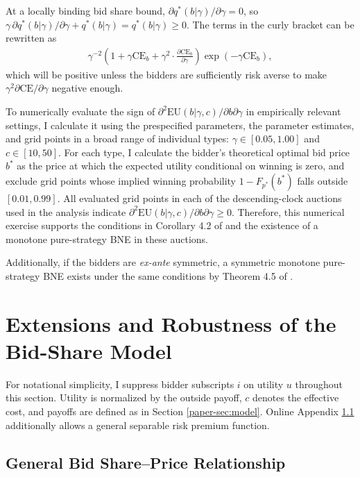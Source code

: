 \documentclass[12pt]{article}
\theoremstyle{definition} %
\begin{document}
At a locally binding bid share bound, $\partial q^\ast(b|\gamma)/\partial\gamma=0$, so $\gamma\,\partial q^\ast(b|\gamma)/\partial\gamma+q^\ast(b|\gamma)=q^\ast(b|\gamma)\geq0$.
The terms in the curly bracket can be rewritten as
\begin{align*}
\gamma^{-2} \left(1 + \gamma \mathrm{CE}_b + \gamma^2 \cdot \frac{\partial \mathrm{CE}_b}{\partial \gamma} \right) \exp(-\gamma \mathrm{CE}_b),
\end{align*}
which will be positive unless the bidders are sufficiently risk averse to make $\gamma^2 \partial \mathrm{CE}/\partial \gamma $ negative enough.

To numerically evaluate the sign of $\partial^2 \mathrm{EU}(b|\gamma,c)/\partial b \partial \gamma$ in empirically relevant settings, I calculate it using the prespecified parameters, the parameter estimates, and grid points in a broad range of individual types: $\gamma \in [0.05,1.00]$ and $c \in [10,50]$. For each type, I calculate the bidder's theoretical optimal bid price $b^\ast$ as the price at which the expected utility conditional on winning is zero, and exclude grid points whose implied winning probability $1-F_{p^\ast}(b^\ast)$ falls outside $[0.01,0.99]$. All evaluated grid points in each of the  descending-clock auctions used in the analysis indicate $\partial^2 \mathrm{EU}(b|\gamma,c)/\partial b \partial \gamma \geq 0$. Therefore, this numerical exercise supports the conditions in Corollary 4.2 of \citet{Reny2011} and the existence of a monotone pure-strategy BNE in these auctions.

Additionally, if the bidders are \textit{ex-ante} symmetric, a symmetric monotone pure-strategy BNE exists under the same conditions by Theorem 4.5 of \citet{Reny2011}.


\section{Extensions and Robustness of the Bid-Share Model}

For notational simplicity, I suppress bidder subscripts $i$ on utility $u$ throughout this section. Utility is normalized by the outside payoff, $c$ denotes the effective cost, and payoffs are defined as in Section \ref{paper-sec:model}. Online Appendix \ref{sec:shareprice} additionally allows a general separable risk premium function.

\subsection{General Bid Share--Price Relationship}
\label{sec:shareprice}
\end{document}
